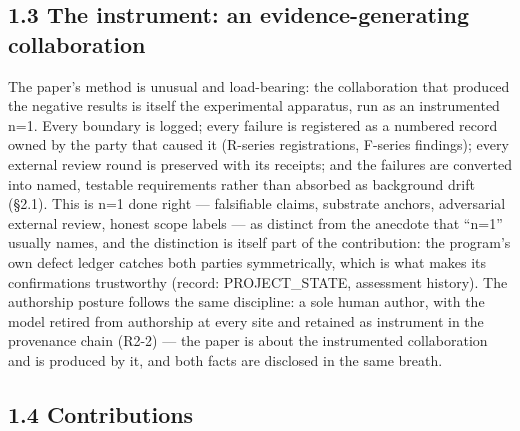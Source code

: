 \documentclass[11pt]{article}
\begin{document}
\subsection{1.3 The instrument: an evidence-generating collaboration}\label{the-instrument-an-evidence-generating-collaboration}

The paper's method is unusual and load-bearing: the collaboration that produced the negative results is itself the experimental apparatus, run as an instrumented n=1. Every boundary is logged; every failure is registered as a numbered record owned by the party that caused it (R-series registrations, F-series findings); every external review round is preserved with its receipts; and the failures are converted into named, testable requirements rather than absorbed as background drift (\S{}2.1). This is n=1 done right --- falsifiable claims, substrate anchors, adversarial external review, honest scope labels --- as distinct from the anecdote that ``n=1'' usually names, and the distinction is itself part of the contribution: the program's own defect ledger catches both parties symmetrically, which is what makes its confirmations trustworthy (record: PROJECT\_STATE, assessment history). The authorship posture follows the same discipline: a sole human author, with the model retired from authorship at every site and retained as instrument in the provenance chain (R2-2) --- the paper is about the instrumented collaboration and is produced by it, and both facts are disclosed in the same breath.

\subsection{1.4 Contributions}\label{contributions}
\end{document}
